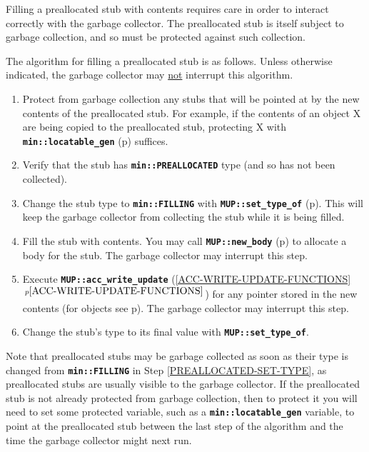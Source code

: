 \documentclass[12pt]{article}
\newcommand{\TT}[1]{{\tt \bfseries #1}}
\newcommand{\itemref}[1]{\ref{#1}$\,^{p\pageref{#1}}$}
\newcommand{\pagref}[1]{p\pageref{#1}}
\newcommand{\EOL}{\penalty \exhyphenpenalty}
\begin{document}
Filling a preallocated stub with contents requires care in order
to interact correctly with the garbage collector.  The preallocated
stub is itself subject to garbage collection, and so must be protected
against such collection.

The algorithm for filling a preallocated stub is as follows.  Unless
otherwise indicated, the garbage collector may \underline{not} interrupt this
algorithm.

\begin{enumerate}
\item\label{PREALLOCATE-PROTECTING-POINTERS}
Protect from garbage collection
any stubs that will be pointed at by the new contents of the preallocated stub.
For example, if the contents of an object X are being copied to
the preallocated stub, protecting X with \TT{min::\EOL locatable\_\EOL gen}
(\pagref{MIN::LOCATABLE_GEN}) suffices.

\item\label{PREALLOCATED-CHECK-TYPE}
Verify that the stub has \TT{min::PREALLOCATED} type (and so has
not been collected).

\item\label{PREALLOCATED-SET-FILLING}
Change the stub type to \TT{min::FILLING}
with \TT{MUP::\EOL set\_\EOL type\_\EOL of} (\pagref{MUP::SET_TYPE_OF}).
This will keep the garbage collector from collecting the stub while it
is being filled.

\item\label{PREALLOCATED-CONTENT-FILLING}
Fill the stub with contents.  You may call \TT{MUP::\EOL new\_\EOL body}
(\pagref{MUP::NEW_BODY}) to allocate a body for the stub.
The garbage collector
may interrupt this step.

\item\label{PREALLOCATED-ACC-WRITE-UPDATE}
Execute \TT{MUP::\EOL acc\_\EOL write\_\EOL update}
(\itemref{ACC-WRITE-UPDATE-FUNCTIONS}) for any pointer
stored in the new contents
(for objects see \pagref{MUP::ACC_WRITE_UPDATE_OF_OBJ_VEC_PTR}).
The garbage collector
may interrupt this step.

\item\label{PREALLOCATED-SET-TYPE}
Change the stub's type to its final value with
\TT{MUP::\EOL set\_\EOL type\_\EOL of}.

\end{enumerate}

Note that preallocated stubs may be garbage collected as soon
as their type is changed from \TT{min::\EOL FILLING}
in Step \ref{PREALLOCATED-SET-TYPE},
as preallocated stubs are usually visible to the garbage collector.
If the preallocated stub is not already protected from garbage collection,
then to protect it you will need to set some protected variable, such
as a \TT{min::\EOL locatable\_\EOL gen} variable,
to point at the preallocated stub between the last step
of the algorithm and the time the garbage collector might next run.
\end{document}
